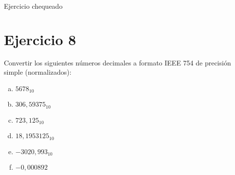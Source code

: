 \documentclass{article}
\begin{document}
{\color{green} Ejercicio chequeado}

\section*{Ejercicio 8}
Convertir los siguientes números decimales a formato IEEE 754 de precisión simple (normalizados):

\begin{enumerate}[a)]
    \item $5678_{10}$
    \item $306,59375_{10}$
    \item $723,125_{10}$
    \item $18,1953125_{10}$
    \item $-3020,993_{10}$
    \item $-0,000892$
\end{enumerate}
\newpage
\end{document}
